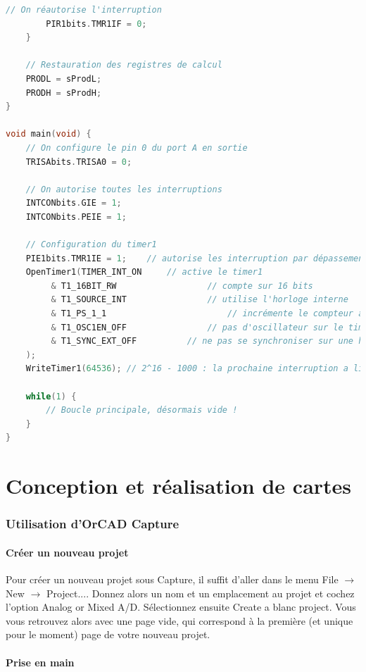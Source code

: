 \documentclass[a4paper]{article}
\begin{document}
\begin{lstlisting}[caption=Programme faisant clignoter une \ac{LED} sur interruption, label=Programme_faisant_clignoter_une_LED_sur_interruption, language=c]
		// On réautorise l'interruption
		PIR1bits.TMR1IF = 0;
	}

	// Restauration des registres de calcul
	PRODL = sProdL;
	PRODH = sProdH;
}

void main(void) {
	// On configure le pin 0 du port A en sortie
	TRISAbits.TRISA0 = 0;

	// On autorise toutes les interruptions
	INTCONbits.GIE = 1;
	INTCONbits.PEIE = 1;

	// Configuration du timer1
	PIE1bits.TMR1IE = 1;	// autorise les interruption par dépassement du Timer (Timer overflow)
	OpenTimer1(TIMER_INT_ON		// active le timer1
		 & T1_16BIT_RW					// compte sur 16 bits
		 & T1_SOURCE_INT				// utilise l'horloge interne
		 & T1_PS_1_1						// incrémente le compteur à chaque cycle (1:1)
		 & T1_OSC1EN_OFF				// pas d'oscillateur sur le timer1
		 & T1_SYNC_EXT_OFF			// ne pas se synchroniser sur une horloge externe
	);
	WriteTimer1(64536); // 2^16 - 1000 : la prochaine interruption a lieu dans 1000 cycles = 100us

	while(1) {
		// Boucle principale, désormais vide !
	}
}
\end{lstlisting}

\newpage
\part{Conception et réalisation de cartes}

\section{Utilisation d'OrCAD Capture}

\subsection{Créer un nouveau projet}

Pour créer un nouveau projet sous Capture, il suffit d'aller dans le menu \og{}File\fg{} $\rightarrow$ \og{}New\fg{} $\rightarrow$ \og{}Project...\fg{}. Donnez alors un nom et un emplacement au projet et cochez l'option \og{}Analog or Mixed A/D\fg{}. Sélectionnez ensuite \og{}Create a blanc project\fg{}. Vous vous retrouvez alors avec une page vide, qui correspond à la première (et unique pour le moment) page de votre nouveau projet.

\subsection{Prise en main}
\end{document}
